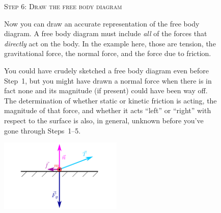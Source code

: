 \documentclass[10pt,letterpaper,twoside]{article}
\begin{document}
\begin{figure}[h!]
  \begin{minipage}[l]{0.70\textwidth}
	{\Large\textsc{Step 6}:} {\large\textsc{Draw the free body diagram}}{\quad}

	Now you can draw an accurate representation of the free body diagram.
	A free body diagram must include \textit{all} of the forces that \textit{directly} act on the body. In the example here, those are tension, the gravitational force, the normal force, and the force due to friction.

	\vspace{10pt}
	You could have crudely sketched a free body diagram even before Step~1, but you might have drawn a normal force when there is in fact none and its magnitude (if present) could have been way off. The determination of whether static or kinetic friction is acting, the magnitude of that force, and whether it acts ``left'' or ``right'' with respect to the surface is also, in general, unknown before you've gone through Steps~1--5.
  \end{minipage}
  \begin{minipage}[c]{0.25\textwidth}
	\includegraphics[keepaspectratio=true,width=2.30in]{./how_to_normal_force_and_friction_f06.pdf}
    \label{fig:06}
  \end{minipage}
\end{figure}
\FloatBarrier
\end{document}
